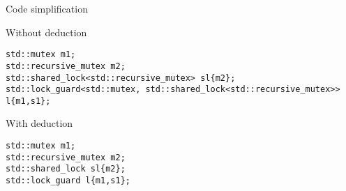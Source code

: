 \begin{frame}[t,fragile]{Code simplification}

\begin{block}{Without deduction}
\begin{lstlisting}
std::mutex m1;
std::recursive_mutex m2;
std::shared_lock<std::recursive_mutex> sl{m2};
std::lock_guard<std::mutex, std::shared_lock<std::recursive_mutex>> l{m1,s1};
\end{lstlisting}
\end{block}

\begin{block}{With deduction}
\begin{lstlisting}
std::mutex m1;
std::recursive_mutex m2;
std::shared_lock sl{m2};
std::lock_guard l{m1,s1};
\end{lstlisting}
\end{block}

\end{frame}
